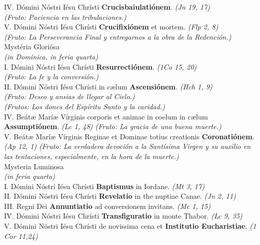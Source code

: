 \documentclass[letterpaper, landscape, 10pt, twocolumn]{article}
\begin{document}
  {\color{red} IV.} Dómini Nóstri Iésu Chrísti \textbf{Crucisbaiulatiónem}. {\color{red} \textit{(Jn 19, 17)\\
  (Fruto: Paciencia en las tribulaciones.)}}\\
  {\color{red} V.} Dómini Nóstri Iésu Chrísti \textbf{Crucifixiónem} et mortem. {\color{red} \textit{(Flp 2, 8)\\
  (Fruto: La Perseverancia Final y entregarnos a la obra de la Redención.)}}\\

  \Large {\color{red} Mystéria Gloriósa}\\
  \normalsize {\color{red} \textit{(in Dominica, in feria quarta)}}\\
  {\color{red} I.} Dómini Nóstri Iésu Chrísti \textbf{Resurrectiónem}. {\color{red} \textit{(1Co 15, 20)}}\\
  {\color{red} \textit{(Fruto: La fe y la conversión.)}}\\
  {\color{red} II.} Dómini Nóstri Iésu Chrísti in cælum \textbf{Ascensiónem}. {\color{red} \textit{(Hch 1, 9)}}\\
  {\color{red} \textit{(Fruto: Deseo y ansias de llegar al Cielo.)}}\\
  {\color{red} \textit{(Frutos: Los dones del Espíritu Santo y la caridad.)}}\\
  {\color{red} IV.} Beátæ Maríæ Vírginis corporis et animae in coelum in cælum \textbf{Assumptiónem}. {\color{red} \textit{(Lc 1, 48)}} {\color{red} \textit{(Fruto: La gracia de una buena muerte.)}}\\
  {\color{red} V.} Beátæ Maríæ Vírginis Reginae et Dominae totius creationis
  \textbf{Coronatiónem}. {\color{red} \textit{(Ap 12, 1)}} {\color{red} \textit{(Fruto: La verdadera devoción a la Santísima Virgen y su auxilio en las tentaciones, especialmente, en la hora de la muerte.)}}\\

  \Large {\color{red} Mysteria Luminosa}\\
  \normalsize {\color{red} \textit{(in feria quarta)}}\\
  {\color{red} I.} Dómini Nóstri Iésu Chrísti \textbf{Baptismus} in Iordane. {\color{red} \textit{(Mt 3, 17)}}\\
  {\color{red} II.} Dómini Nóstri Iésu Chrísti \textbf{Revelatio} in the nuptiae Canae. {\color{red} \textit{(Jn 2, 11)}}\\
  {\color{red} III.} Regni Dei \textbf{Annuntiatio} ad conversionem invitans. {\color{red} \textit{(Mc 1, 15)}}\\
  {\color{red} IV.} Dómini Nóstri Iésu Chrísti \textbf{Transfiguratio} in monte Thabor.
  {\color{red} \textit{(Lc 9, 35)}}\\
  {\color{red} V.} Dómini Nóstri Iésu Chrísti de novissima cena et \textbf{Institutio Eucharistiae}. {\color{red} \textit{(1 Cor 11,24)}}\\
\end{document}
